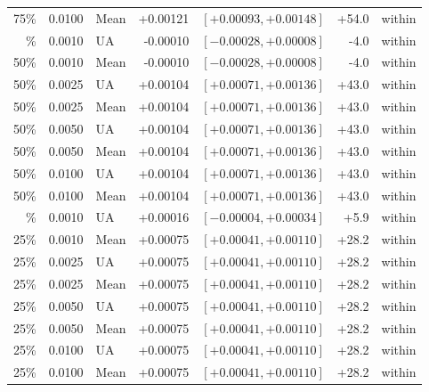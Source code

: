 \begin{table}[H]
\begin{tabular}{@{}rrlrrrl@{}}
75\% & 0.0100 & Mean & +0.00121 & $[+0.00093, +0.00148]$ & +54.0 & within \\
\addlinespace
50\% & 0.0010 & UA & -0.00010 & $[-0.00028, +0.00008]$ & -4.0 & within \\
50\% & 0.0010 & Mean & -0.00010 & $[-0.00028, +0.00008]$ & -4.0 & within \\
50\% & 0.0025 & UA & +0.00104 & $[+0.00071, +0.00136]$ & +43.0 & within \\
50\% & 0.0025 & Mean & +0.00104 & $[+0.00071, +0.00136]$ & +43.0 & within \\
50\% & 0.0050 & UA & +0.00104 & $[+0.00071, +0.00136]$ & +43.0 & within \\
50\% & 0.0050 & Mean & +0.00104 & $[+0.00071, +0.00136]$ & +43.0 & within \\
50\% & 0.0100 & UA & +0.00104 & $[+0.00071, +0.00136]$ & +43.0 & within \\
50\% & 0.0100 & Mean & +0.00104 & $[+0.00071, +0.00136]$ & +43.0 & within \\
\addlinespace
25\% & 0.0010 & UA & +0.00016 & $[-0.00004, +0.00034]$ & +5.9 & within \\
25\% & 0.0010 & Mean & +0.00075 & $[+0.00041, +0.00110]$ & +28.2 & within \\
25\% & 0.0025 & UA & +0.00075 & $[+0.00041, +0.00110]$ & +28.2 & within \\
25\% & 0.0025 & Mean & +0.00075 & $[+0.00041, +0.00110]$ & +28.2 & within \\
25\% & 0.0050 & UA & +0.00075 & $[+0.00041, +0.00110]$ & +28.2 & within \\
25\% & 0.0050 & Mean & +0.00075 & $[+0.00041, +0.00110]$ & +28.2 & within \\
25\% & 0.0100 & UA & +0.00075 & $[+0.00041, +0.00110]$ & +28.2 & within \\
25\% & 0.0100 & Mean & +0.00075 & $[+0.00041, +0.00110]$ & +28.2 & within \\
\bottomrule
\end{tabular}
\end{table}
